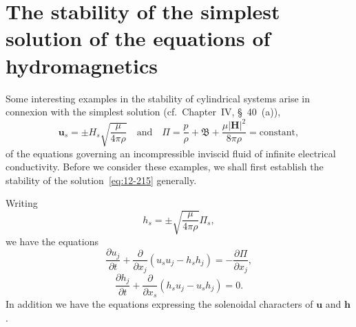 \section{The stability of the simplest solution of the equations of hydromagnetics}\label{sec:113}
Some interesting examples in the stability of cylindrical systems arise in connexion with the simplest solution (cf.\ Chapter~IV, \S~40~(a)),
\begin{equation}
\label{eq:12-215}
\mathbf{u}_s = \pm H_s\sqrt{\frac{\mu}{4\pi\rho}} \quad \text{and} \quad \Pi = \frac{p}{\rho} + \mathfrak{B} + \frac{\mu|\mathbf{H}|^2}{8\pi\rho} = \text{constant},
\end{equation}
of the equations governing an incompressible inviscid fluid of infinite electrical conductivity. Before we consider these examples, we shall first establish the stability of the solution~\eqref{eq:12-215} generally.

Writing
\begin{equation}
\label{eq:12-216}
h_s = \pm\sqrt{\frac{\mu}{4\pi\rho}}\Pi_s,
\end{equation}
we have the equations
\begin{equation}
\label{eq:12-217}
\frac{\partial u_j}{\partial t} + \frac{\partial}{\partial x_j}(u_s u_j - h_s h_j) = -\frac{\partial \Pi}{\partial x_j},
\end{equation}
\begin{equation}
\label{eq:12-218}
\frac{\partial h_j}{\partial t} + \frac{\partial}{\partial x_s}(h_s u_j - u_s h_j) = 0.
\end{equation}
In addition we have the equations expressing the solenoidal characters of $\mathbf{u}$ and $\mathbf{h}$.

